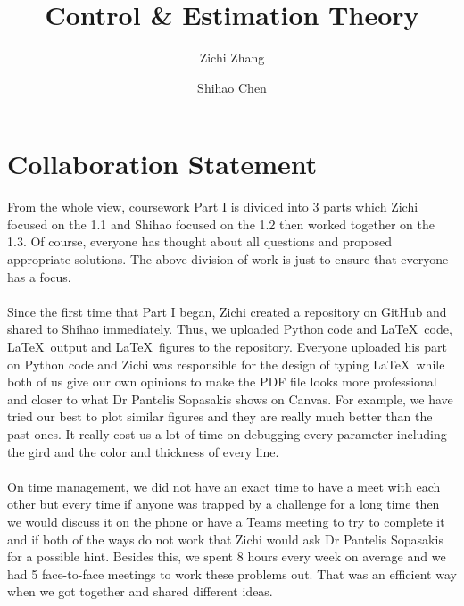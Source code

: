 \documentclass[a4paper,11pt,reqno]{amsart}
\title[ELE8088 Coursework]{Control \& Estimation Theory}
\author[Z. Zhang]{Zichi Zhang}
\author[S. Chen]{Shihao Chen}
\begin{document}
\maketitle

\vspace*{\fill}
\section*{\textbf{Collaboration Statement}}
    \noindent From the whole view, coursework Part I is divided into 3 parts which Zichi focused on the 1.1 and Shihao focused on the 1.2 then worked together on the 1.3.
    Of course, everyone has thought about all questions and proposed appropriate solutions. The above division of work is just to ensure that everyone has a focus.
    \\ \ \\
    Since the first time that Part I began, Zichi created a repository on GitHub and shared to Shihao immediately. Thus, we uploaded Python code and \LaTeX\ code, \LaTeX\ output and \LaTeX\ figures to the repository. Everyone uploaded his part on Python code and Zichi was responsible for the design of typing \LaTeX\ while both of us give our own opinions to make the PDF file looks more professional and closer to what Dr Pantelis Sopasakis shows on Canvas. For example, we have tried our best to plot similar figures and they are really much better than the past ones. It really cost us a lot of time on debugging every parameter including the gird and the color and thickness of every line.
    \\ \ \\
    On time management, we did not have an exact time to have a meet with each other but every time if anyone was trapped by a challenge for a long time then we would discuss it on the phone or have a Teams meeting to try to complete it and if both of the ways do not work that Zichi would ask Dr Pantelis Sopasakis for a possible hint. Besides this, we spent 8 hours every week on average and we had 5 face-to-face meetings to work these problems out. That was an efficient way when we got together and shared different ideas.
    \\ \ \\
\end{document}
